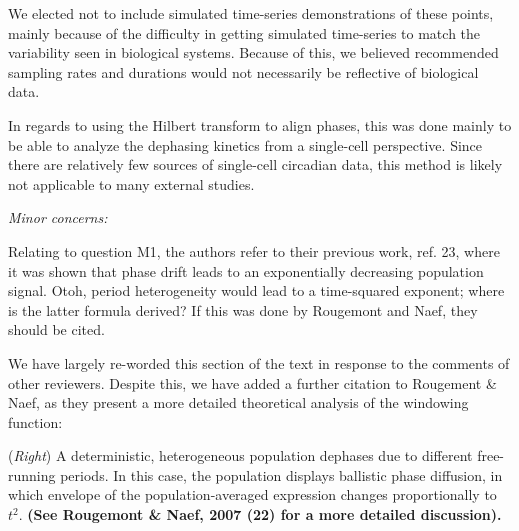 \documentclass[11pt, letterpaper]{article}
\newenvironment{reviewer}{\itshape\color{gray}}{}
\newenvironment{manuscript}[1]{\begin{center}\begin{tcolorbox}[colback=green!5!white,colframe=green!75!black,width=\textwidth,title={#1},breakable,fonttitle=\bfseries]}{\end{tcolorbox}\end{center}}
\begin{document}
We elected not to include simulated time-series demonstrations of these points, mainly because of the difficulty in getting simulated time-series to match the variability seen in biological systems.
Because of this, we believed recommended sampling rates and durations would not necessarily be reflective of biological data.

In regards to using the Hilbert transform to align phases, this was done mainly to be able to analyze the dephasing kinetics from a single-cell perspective.
Since there are relatively few sources of single-cell circadian data, this method is likely not applicable to many external studies.


% 



\begin{reviewer}
Minor concerns:

Relating to question M1, the authors refer to their previous work, ref. 23, where it was shown that phase drift leads to an exponentially decreasing population signal. Otoh, period heterogeneity would lead to a time-squared exponent; where is the latter formula derived? If this was done by Rougemont and Naef, they should be cited.
\end{reviewer}

We have largely re-worded this section of the text in response to the comments of other reviewers. Despite this, we have added a further citation to Rougement \& Naef, as they present a more detailed theoretical analysis of the windowing function:

\begin{manuscript}{Page 21}
   ({\itshape Right}) A deterministic, heterogeneous population dephases due to different free-running periods. In this case, the population displays ballistic phase diffusion, in which envelope of the population-averaged expression changes proportionally to $t^2$. {\bfseries (See Rougemont \& Naef, 2007 (22) for a more detailed discussion).}
\end{manuscript}
\end{document}
